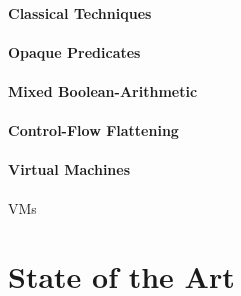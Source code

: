 \subsubsection{Classical Techniques}

\subsubsection{Opaque Predicates}

\subsubsection{Mixed Boolean-Arithmetic}

\subsubsection{Control-Flow Flattening}

\subsubsection{Virtual Machines}


\cite{malware_obf}




\Glspl{VM} 


\chapter{State of the Art}



